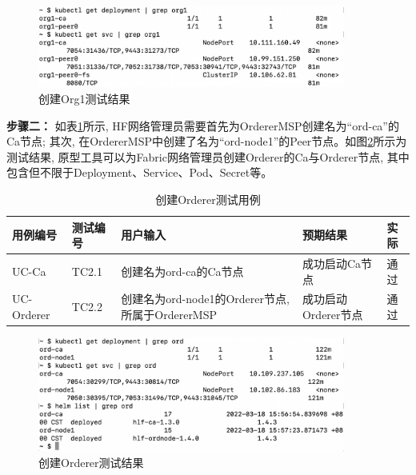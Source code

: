 \begin{figure}[h] %
    \centering %
    \includegraphics[width=0.9\textwidth]{FIGs/chapter5/peer.png} %
    \caption{创建Org1测试结果} %
    \label{testcase1result} %
\end{figure}%

\textbf{步骤二：} 如表\ref{orderer_test}所示, HF网络管理员需要首先为OrdererMSP创建名为“ord-ca”的Ca节点; 其次, 在OrdererMSP中创建了名为“ord-node1”的Peer节点。如图\ref{testcase2result}所示为测试结果, 原型工具可以为Fabric网络管理员创建Orderer的Ca与Orderer节点, 其中包含但不限于Deployment、Service、Pod、Secret等。

{\footnotesize
\begin{longtable}[h]{m{45pt} m{45pt} m{180pt} m{50pt} m{20pt}}
    \caption[创建Orderer测试用例]{创建Orderer测试用例} \label{orderer_test}\\
        \hline  
        用例编号&测试编号&用户输入&预期结果&实际\\
        \hline
        UC-Ca & TC2.1 & 创建名为ord-ca的Ca节点 & 成功启动Ca节点 & 通过 \\
        \hline
        UC-Orderer & TC2.2 & 创建名为ord-node1的Orderer节点, 所属于OrdererMSP & 成功启动Orderer节点 & 通过 \\
        \hline
    \end{longtable} 
}

\begin{figure}[h] %
    \centering %
    \includegraphics[width=0.9\textwidth]{FIGs/chapter5/orderer.png} %
    \caption{创建Orderer测试结果} %
    \label{testcase2result} %
\end{figure}%

